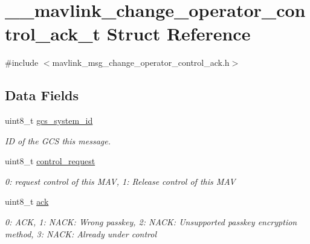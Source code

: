\hypertarget{struct____mavlink__change__operator__control__ack__t}{\section{\+\_\+\+\_\+mavlink\+\_\+change\+\_\+operator\+\_\+control\+\_\+ack\+\_\+t Struct Reference}
\label{struct____mavlink__change__operator__control__ack__t}
}


{\ttfamily \#include $<$mavlink\+\_\+msg\+\_\+change\+\_\+operator\+\_\+control\+\_\+ack.\+h$>$}

\subsection*{Data Fields}
\begin{DoxyCompactItemize}
\item 
uint8\+\_\+t \hyperlink{struct____mavlink__change__operator__control__ack__t_adb8f2a279063a0615952eda9f2b3dc24}{gcs\+\_\+system\+\_\+id}
\begin{DoxyCompactList}\small\item\em I\+D of the G\+C\+S this message. \end{DoxyCompactList}\item 
uint8\+\_\+t \hyperlink{struct____mavlink__change__operator__control__ack__t_a3b0abe5ae412967c3341c6e90f09d0d6}{control\+\_\+request}
\begin{DoxyCompactList}\small\item\em 0\+: request control of this M\+A\+V, 1\+: Release control of this M\+A\+V \end{DoxyCompactList}\item 
uint8\+\_\+t \hyperlink{struct____mavlink__change__operator__control__ack__t_a420017052e533270a67f82a663bc07fa}{ack}
\begin{DoxyCompactList}\small\item\em 0\+: A\+C\+K, 1\+: N\+A\+C\+K\+: Wrong passkey, 2\+: N\+A\+C\+K\+: Unsupported passkey encryption method, 3\+: N\+A\+C\+K\+: Already under control \end{DoxyCompactList}\end{DoxyCompactItemize}


